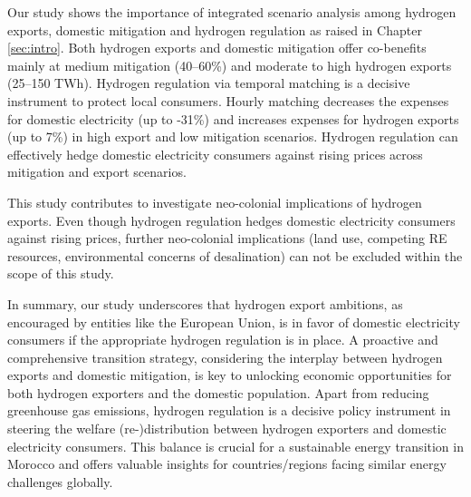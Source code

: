 



Our study shows the importance of integrated scenario analysis among hydrogen exports, domestic mitigation and hydrogen regulation as raised in Chapter \ref{sec:intro}.
Both hydrogen exports and domestic mitigation offer co-benefits mainly at medium mitigation (40--60\%) and moderate to high hydrogen exports (25--150 TWh). Hydrogen regulation via temporal matching is a decisive instrument
to protect local consumers. Hourly matching decreases the expenses for domestic electricity (up to -31\%) and increases expenses for hydrogen exports (up to 7\%) in high export and low mitigation scenarios. Hydrogen regulation can effectively hedge domestic electricity consumers against rising prices across mitigation and export scenarios. %

This study contributes to investigate neo-colonial implications of hydrogen exports. Even though hydrogen regulation hedges domestic electricity consumers against rising prices, further neo-colonial implications (land use, competing RE resources, environmental concerns of desalination) can not be excluded within the scope of this study.


In summary, our study underscores that hydrogen export ambitions, as encouraged by entities like the European Union, is in favor of domestic electricity consumers 
if the appropriate hydrogen regulation is in place. A proactive and comprehensive transition strategy, considering the interplay between hydrogen exports and domestic mitigation, is key to unlocking economic opportunities for both hydrogen exporters and the domestic population. 
Apart from reducing greenhouse gas emissions, hydrogen regulation is a decisive policy instrument in steering the welfare (re-)distribution between hydrogen exporters and domestic electricity consumers. 
This balance is crucial for a sustainable energy transition in Morocco and offers valuable insights for countries/regions facing similar energy challenges globally.



